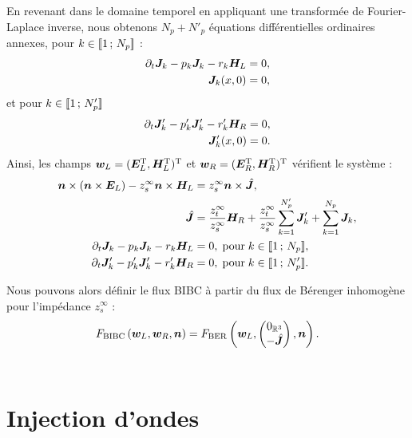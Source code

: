 En revenant dans le domaine temporel en appliquant une transformée de Fourier-Laplace
inverse, nous obtenons $N_p + N'_p$ équations différentielles ordinaires annexes,
pour $k \in \lbrack\!\lbrack1\,;\,N_p\rbrack\!\rbrack$ :
\begin{subequations}
	\begin{align}
	\partial_{t} \bm{J}_k - p_k \bm{J}_k - r_k \bm{H}_L &= 0 , \\
	\bm{J}_k(x, 0) &= 0 ,
	\end{align}
\end{subequations}
et pour $k \in \lbrack\!\lbrack1\,;\,N'_p\rbrack\!\rbrack$
\begin{subequations}
	\begin{align}
	\partial_{t} \bm{J}'_k - p'_k \bm{J}'_k - r'_k \bm{H}_R &= 0 , \\
	\bm{J}'_k(x, 0) &= 0 .
	\end{align}
\end{subequations}
Ainsi, les champs $\bm{w}_L = (\bm{E}_L^{\mathrm{T}},\bm{H}_L^{\mathrm{T}})^{\mathrm{T}}$
et $\bm{w}_R = (\bm{E}_R^{\mathrm{T}},\bm{H}_R^{\mathrm{T}})^{\mathrm{T}}$
vérifient le système :
\begin{subequations}
	\begin{align}
	\bm{n} \times (\bm{n} \times \bm{E}_L) - z_s^\infty \bm{n} \times \bm{H}_L &=
	z_s^\infty \bm{n} \times \hat{\bm{J}} , \\
	\hat{\bm{J}} &= \frac{z_t^\infty}{z_s^\infty} \bm{H}_R +
	\frac{z_t^\infty}{z_s^\infty} \sum_{k = 1}^{N'_p} \bm{J}'_k +
	\sum_{k = 1}^{N_p} \bm{J}_k , \\
	\partial_{t} \bm{J}_k - p_k \bm{J}_k - r_k \bm{H}_L &= 0 ,
	\; \mathrm{pour} \; k \in \lbrack\!\lbrack1\,;\,N_p\rbrack\!\rbrack , \\
	\partial_{t} \bm{J}'_k - p'_k \bm{J}'_k - r'_k \bm{H}_R &= 0 ,
	\; \mathrm{pour} \; k \in \lbrack\!\lbrack1\,;\,N'_p\rbrack\!\rbrack .
	\end{align}
\end{subequations}

Nous pouvons alors définir le flux BIBC à partir du flux de Bérenger
inhomogène pour l'impédance $z_s^\infty$ :
\begin{align}
F_\mathrm{BIBC}\left(\bm{w}_L,\bm{w}_R,\bm{n}\right) = 
F_\mathrm{BER}\left(\bm{w}_L,\begin{pmatrix}
0_{\mathbb{R}^{3}} \\
- \hat{\bm{J}}
\end{pmatrix},\bm{n}\right) .
\end{align}
\\



\section{Injection d'ondes}
\label{sect:injection_ondes}

